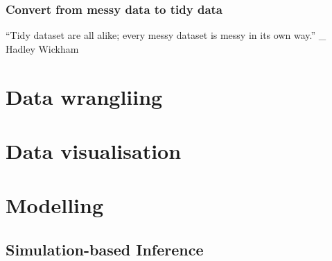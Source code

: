 \documentclass[
]{book}
\begin{document}
\hypertarget{convert-from-messy-data-to-tidy-data}{%
\subsection{Convert from messy data to tidy data}\label{convert-from-messy-data-to-tidy-data}}

``Tidy dataset are all alike; every messy dataset is messy in its own way.'' \_ Hadley Wickham

\hypertarget{data-wrangliing}{%
\chapter{Data wrangliing}\label{data-wrangliing}}

\hypertarget{data-visualisation}{%
\chapter{Data visualisation}\label{data-visualisation}}

\hypertarget{modelling}{%
\chapter{Modelling}\label{modelling}}

\hypertarget{simulation-based-inference}{%
\section{Simulation-based Inference}\label{simulation-based-inference}}

  
\end{document}
